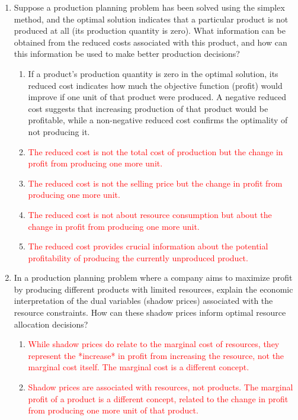 \documentclass{article}%
\newcommand{\incorrect}[1]{\textcolor{red}{#1}}
\begin{document}
\begin{enumerate}
\begin{enumerate}
\end{enumerate}%
\vspace{1em}%
\item Suppose a production planning problem has been solved using the simplex method, and the optimal solution indicates that a particular product is not produced at all (its production quantity is zero).  What information can be obtained from the reduced costs associated with this product, and how can this information be used to make better production decisions?%
\begin{enumerate}%
\item If a product's production quantity is zero in the optimal solution, its reduced cost indicates how much the objective function (profit) would improve if one unit of that product were produced.  A negative reduced cost suggests that increasing production of that product would be profitable, while a non-negative reduced cost confirms the optimality of not producing it.%
\item \incorrect{The reduced cost is not the total cost of production but the change in profit from producing one more unit.}%
\item \incorrect{The reduced cost is not the selling price but the change in profit from producing one more unit.}%
\item \incorrect{The reduced cost is not about resource consumption but about the change in profit from producing one more unit.}%
\item \incorrect{The reduced cost provides crucial information about the potential profitability of producing the currently unproduced product.}%
\end{enumerate}%
\vspace{1em}%
\item In a production planning problem where a company aims to maximize profit by producing different products with limited resources, explain the economic interpretation of the dual variables (shadow prices) associated with the resource constraints. How can these shadow prices inform optimal resource allocation decisions?%
\begin{enumerate}%
\item \incorrect{While shadow prices do relate to the marginal cost of resources, they represent the *increase* in profit from increasing the resource, not the marginal cost itself.  The marginal cost is a different concept.}%
\item \incorrect{Shadow prices are associated with resources, not products.  The marginal profit of a product is a different concept, related to the change in profit from producing one more unit of that product.}%

\end{enumerate}
\end{enumerate}
\end{document}
